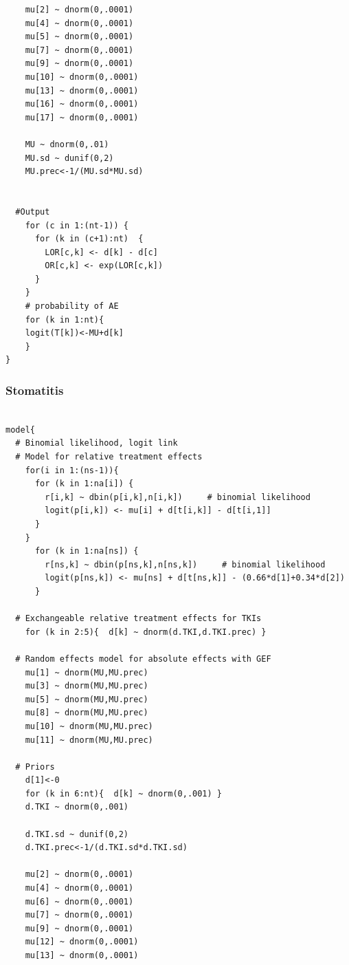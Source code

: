 \documentclass[11pt,final,fleqn]{article}\usepackage[]{graphicx}\usepackage[]{color}
\theoremstyle{plain}
\begin{document}
\begin{appendices}
\begin{verbatim}
    mu[2] ~ dnorm(0,.0001)                     
    mu[4] ~ dnorm(0,.0001)                       
    mu[5] ~ dnorm(0,.0001)                       
    mu[7] ~ dnorm(0,.0001)                       
    mu[9] ~ dnorm(0,.0001)
    mu[10] ~ dnorm(0,.0001)
    mu[13] ~ dnorm(0,.0001)
    mu[16] ~ dnorm(0,.0001)
    mu[17] ~ dnorm(0,.0001)
      
    MU ~ dnorm(0,.01)                        
    MU.sd ~ dunif(0,2) 
    MU.prec<-1/(MU.sd*MU.sd)
    
      
  #Output                                     
    for (c in 1:(nt-1)) {                        
      for (k in (c+1):nt)  { 
        LOR[c,k] <- d[k] - d[c]
        OR[c,k] <- exp(LOR[c,k])
      }  
    }
    # probability of AE
    for (k in 1:nt){ 
    logit(T[k])<-MU+d[k]
    }
}

\end{verbatim}

\subsubsection{Stomatitis} 
\begin{verbatim} 

model{
  # Binomial likelihood, logit link
  # Model for relative treatment effects
    for(i in 1:(ns-1)){                 
      for (k in 1:na[i]) {               
        r[i,k] ~ dbin(p[i,k],n[i,k])     # binomial likelihood
        logit(p[i,k]) <- mu[i] + d[t[i,k]] - d[t[i,1]]  
      }
    }   
      for (k in 1:na[ns]) {               
        r[ns,k] ~ dbin(p[ns,k],n[ns,k])     # binomial likelihood
        logit(p[ns,k]) <- mu[ns] + d[t[ns,k]] - (0.66*d[1]+0.34*d[2])  
      }
  
  # Exchangeable relative treatment effects for TKIs
    for (k in 2:5){  d[k] ~ dnorm(d.TKI,d.TKI.prec) }
  
  # Random effects model for absolute effects with GEF
    mu[1] ~ dnorm(MU,MU.prec) 
    mu[3] ~ dnorm(MU,MU.prec) 
    mu[5] ~ dnorm(MU,MU.prec) 
    mu[8] ~ dnorm(MU,MU.prec) 
    mu[10] ~ dnorm(MU,MU.prec) 
    mu[11] ~ dnorm(MU,MU.prec)
       
  # Priors
    d[1]<-0                                      
    for (k in 6:nt){  d[k] ~ dnorm(0,.001) }    
    d.TKI ~ dnorm(0,.001)
    
    d.TKI.sd ~ dunif(0,2) 
    d.TKI.prec<-1/(d.TKI.sd*d.TKI.sd)
    
    mu[2] ~ dnorm(0,.0001)                     
    mu[4] ~ dnorm(0,.0001)                       
    mu[6] ~ dnorm(0,.0001)                       
    mu[7] ~ dnorm(0,.0001)                       
    mu[9] ~ dnorm(0,.0001)
    mu[12] ~ dnorm(0,.0001)
    mu[13] ~ dnorm(0,.0001)


\end{verbatim}
\end{appendices}
\end{document}
